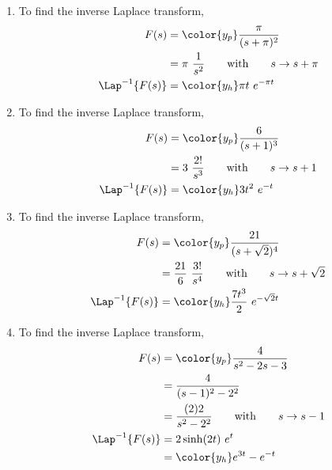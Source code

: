 \begin{enumerate}
      \item To find the inverse Laplace transform,
            \begin{align}
                  F(s)              & = \color{y_p} \frac{\pi}{(s+\pi)^2} \\
                                    & = \pi\ \frac{1}{s^2}
                  \qquad \text{with} \qquad s \rightarrow s+\pi           \\
                  \Lap^{-1}\{F(s)\} & = \color{y_h} \pi t\ e^{-\pi t}
            \end{align}

      \item To find the inverse Laplace transform,
            \begin{align}
                  F(s)              & = \color{y_p} \frac{6}{(s+1)^3} \\
                                    & = 3\ \frac{2!}{s^3}
                  \qquad \text{with} \qquad s \rightarrow s+1         \\
                  \Lap^{-1}\{F(s)\} & = \color{y_h} 3t^2\ e^{-t}
            \end{align}

      \item To find the inverse Laplace transform,
            \begin{align}
                  F(s)              & = \color{y_p} \frac{21}{(s+\sqrt{2})^4}      \\
                                    & = \frac{21}{6}\ \frac{3!}{s^4}
                  \qquad \text{with} \qquad s \rightarrow s+\sqrt{2}               \\
                  \Lap^{-1}\{F(s)\} & = \color{y_h} \frac{7t^3}{2}\ e^{-\sqrt{2}t}
            \end{align}

      \item To find the inverse Laplace transform,
            \begin{align}
                  F(s)              & = \color{y_p} \frac{4}{s^2 - 2s - 3} \\
                                    & = \frac{4}{(s-1)^2 - 2^2}            \\
                                    & = \frac{(2)2}{s^2 - 2^2}
                  \qquad \text{with} \qquad s \rightarrow s-1              \\
                  \Lap^{-1}\{F(s)\} & = 2\sinh(2t)\ e^{t}                  \\
                                    & = \color{y_h} e^{3t} - e^{-t}
            \end{align}


\end{enumerate}
